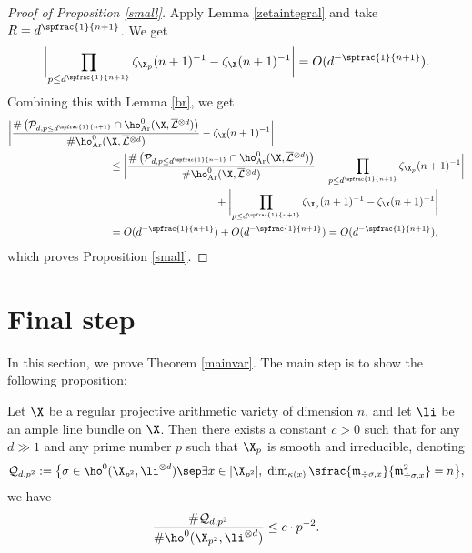 \begin{proof}[Proof of Proposition \ref{small}]
Apply Lemma \ref{zetaintegral} and take $R=d^{\spfrac{1}{n+1}}$. We get
\begin{align*}
\biggl| \prod_{p\leq d^{\spfrac{1}{n+1}}}\zeta_{\X_p}(n+1)^{-1}-\zeta_\X(n+1)^{-1} \biggr| =O(d^{-\spfrac{1}{n+1}}).
\end{align*}
Combining this with Lemma \ref{br}, we get
\begin{align*}
\biggl| \frac{\#\left(\mathcal{P}_{d, p\leq d^{\spfrac{1}{n+1}}}\cap \ho^0_{\mathrm{Ar}}(\X, \overline{\mathcal{L}}{}^{\otimes d})\right)}{\#\ho^0_{\mathrm{Ar}}(\X, \overline{\mathcal{L}}{}^{\otimes d})} &-\zeta_\X(n+1)^{-1} \biggr| \\
&\hspace*{-3cm}\leq \biggl| \frac{\#\left(\mathcal{P}_{d, p\leq d^{\spfrac{1}{n+1}}}\cap \ho^0_{\mathrm{Ar}}(\X, \overline{\mathcal{L}}{}^{\otimes d})\right)}{\#\ho^0_{\mathrm{Ar}}(\X, \overline{\mathcal{L}}{}^{\otimes d})} -\prod_{p\leq d^{\spfrac{1}{n+1}}}\zeta_{\X_p}(n+1)^{-1} \biggr|\\
& \hspace*{.5cm}+\biggl| \prod_{p\leq d^{\spfrac{1}{n+1}}}\zeta_{\X_p}(n+1)^{-1}-\zeta_\X(n+1)^{-1} \biggr| \\
&\hspace*{-3cm}=O(d^{-\spfrac{1}{n+1}})+O(d^{-\spfrac{1}{n+1}})=O(d^{-\spfrac{1}{n+1}}),
\end{align*}
which proves Proposition \ref{small}.
\end{proof}

\section{Final step}\label{finalresult}

In this section, we prove Theorem \ref{mainvar}. The main step is to show the following proposition:
\begin{prop}\label{singmed}
Let $\X$ be a regular projective arithmetic variety of dimension $n$, and let $\li$ be an ample line bundle on $\X$. Then there exists a constant $c>0$ such that for any $d\gg 1$ and any prime number $p$ such that $\X_p$ is smooth and irreducible, denoting
\[
\mathcal{Q}_{d,p^2}:=\bigl\{ \sigma\in \ho^0(\X_{p^2}, \li^{\otimes d})\sep \exists x\in |\X_{p^2}|,\ \dim_{\kappa(x)}\sfrac{\mathfrak{m}_{\div \sigma,x}}{\mathfrak{m}_{\div \sigma,x}^2}=n \bigr\},
\]
we have
\[
\frac{\#\mathcal{Q}_{d,p^2}}{\#\ho^0(\X_{p^2}, \li^{\otimes d})}\leq c\cdot p^{-2}.
\]
\end{prop}

